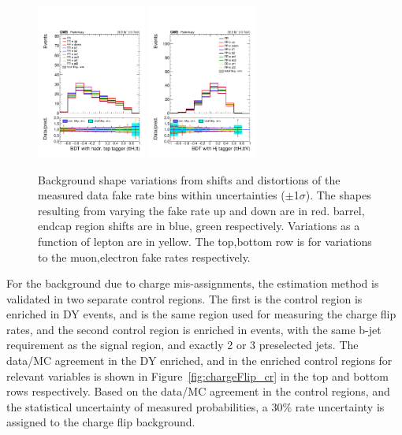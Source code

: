 \begin{figure}[htb]
        \includegraphics[width=0.32\textwidth]{ch10_figs/kinMVA_2lss_e_ttbar_withBDTv8.pdf}
        \includegraphics[width=0.32\textwidth]{ch10_figs/kinMVA_2lss_e_ttV_withHj.pdf}
        \caption[Variations in discrminant shape due to fake rate systematics]{Background shape variations from shifts and distortions of the measured data fake rate bins
          within uncertainties ($\pm$1$\sigma$). 
          The shapes resulting from varying the fake rate up and down are in red. barrel, endcap region shifts are in blue, green respectively. Variations as a function
          of lepton \pt are in yellow. The top,bottom row is for variations to the muon,electron fake rates respectively.}
        \label{fig:FRvars_shape}
\end{figure}

For the background due to charge mis-assignments, the estimation method is validated in two separate control regions.
The first is the control region is enriched in DY events, and is the same region used for measuring the charge flip rates, and the second control region 
is enriched in \ttbar events, with the same b-jet requirement as the signal region, and exactly 2 or 3 preselected jets.
The data/MC agreement in the DY enriched, and in the \ttbar enriched control regions
for relevant variables is shown in Figure~\ref{fig:chargeFlip_cr} in the top and bottom rows respectively.
Based on the data/MC agreement in the control regions, and the statistical uncertainty of measured probabilities,
a 30$\%$ rate uncertainty is assigned to the charge flip background.


